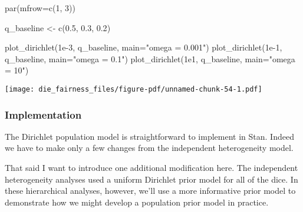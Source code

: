 \documentclass[
  letterpaper,
  DIV=11,
  numbers=noendperiod]{scrartcl}
\newenvironment{Shaded}{\begin{snugshade}}{\end{snugshade}}
\newcommand{\AttributeTok}[1]{\textcolor[rgb]{0.40,0.45,0.13}{#1}}
\newcommand{\ConstantTok}[1]{\textcolor[rgb]{0.56,0.35,0.01}{#1}}
\newcommand{\DecValTok}[1]{\textcolor[rgb]{0.68,0.00,0.00}{#1}}
\newcommand{\FloatTok}[1]{\textcolor[rgb]{0.68,0.00,0.00}{#1}}
\newcommand{\FunctionTok}[1]{\textcolor[rgb]{0.28,0.35,0.67}{#1}}
\newcommand{\NormalTok}[1]{\textcolor[rgb]{0.00,0.23,0.31}{#1}}
\newcommand{\OtherTok}[1]{\textcolor[rgb]{0.00,0.23,0.31}{#1}}
\newcommand{\SpecialCharTok}[1]{\textcolor[rgb]{0.37,0.37,0.37}{#1}}
\newcommand{\StringTok}[1]{\textcolor[rgb]{0.13,0.47,0.30}{#1}}
\begin{document}
\begin{Shaded}
\end{Shaded}

\begin{Shaded}
\begin{Highlighting}[]
\FunctionTok{par}\NormalTok{(}\AttributeTok{mfrow=}\FunctionTok{c}\NormalTok{(}\DecValTok{1}\NormalTok{, }\DecValTok{3}\NormalTok{))}

\NormalTok{q\_baseline }\OtherTok{\textless{}{-}} \FunctionTok{c}\NormalTok{(}\FloatTok{0.5}\NormalTok{, }\FloatTok{0.3}\NormalTok{, }\FloatTok{0.2}\NormalTok{)}

\FunctionTok{plot\_dirichlet}\NormalTok{(}\FloatTok{1e{-}3}\NormalTok{, q\_baseline, }\AttributeTok{main=}\StringTok{"omega = 0.001"}\NormalTok{)}
\FunctionTok{plot\_dirichlet}\NormalTok{(}\FloatTok{1e{-}1}\NormalTok{, q\_baseline, }\AttributeTok{main=}\StringTok{"omega = 0.1"}\NormalTok{)}
\FunctionTok{plot\_dirichlet}\NormalTok{(}\FloatTok{1e1}\NormalTok{,  q\_baseline, }\AttributeTok{main=}\StringTok{"omega = 10"}\NormalTok{)}
\end{Highlighting}
\end{Shaded}

\texttt{[image: die\_fairness\_files/figure-pdf/unnamed-chunk-54-1.pdf]}

\subsubsection{Implementation}\label{implementation-1}

The Dirichlet population model is straightforward to implement in Stan.
Indeed we have to make only a few changes from the independent
heterogeneity model.

That said I want to introduce one additional modification here. The
independent heterogeneity analyses used a uniform Dirichlet prior model
for all of the dice. In these hierarchical analyses, however, we'll use
a more informative prior model to demonstrate how we might develop a
population prior model in practice.
\end{document}
